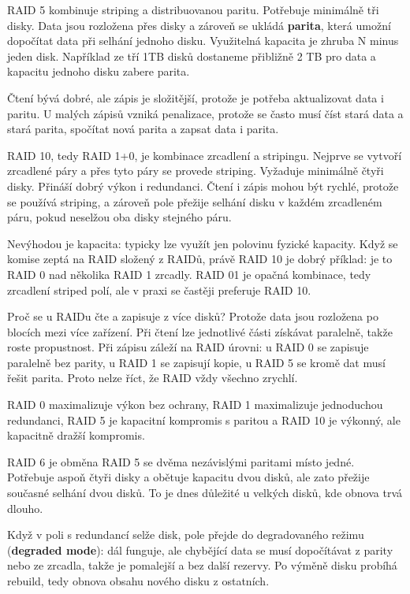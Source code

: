 \documentclass[11pt,a4paper]{article}
\begin{document}
RAID 5 kombinuje striping a distribuovanou paritu. Potřebuje minimálně tři disky. Data jsou rozložena přes disky a zároveň se ukládá \textbf{parita}, která umožní dopočítat data při selhání jednoho disku. Využitelná kapacita je zhruba N minus jeden disk. Například ze tří 1TB disků dostaneme přibližně 2 TB pro data a kapacitu jednoho disku zabere parita.

Čtení bývá dobré, ale zápis je složitější, protože je potřeba aktualizovat data i paritu. U malých zápisů vzniká penalizace, protože se často musí číst stará data a stará parita, spočítat nová parita a zapsat data i parita.

RAID 10, tedy RAID 1+0, je kombinace zrcadlení a stripingu. Nejprve se vytvoří zrcadlené páry a přes tyto páry se provede striping. Vyžaduje minimálně čtyři disky. Přináší dobrý výkon i redundanci. Čtení i zápis mohou být rychlé, protože se používá striping, a zároveň pole přežije selhání disku v každém zrcadleném páru, pokud neselžou oba disky stejného páru.

Nevýhodou je kapacita: typicky lze využít jen polovinu fyzické kapacity. Když se komise zeptá na RAID složený z RAIDů, právě RAID 10 je dobrý příklad: je to RAID 0 nad několika RAID 1 zrcadly. RAID 01 je opačná kombinace, tedy zrcadlení striped polí, ale v praxi se častěji preferuje RAID 10.

Proč se u RAIDu čte a zapisuje z více disků? Protože data jsou rozložena po blocích mezi více zařízení. Při čtení lze jednotlivé části získávat paralelně, takže roste propustnost. Při zápisu záleží na RAID úrovni: u RAID 0 se zapisuje paralelně bez parity, u RAID 1 se zapisují kopie, u RAID 5 se kromě dat musí řešit parita. Proto nelze říct, že RAID vždy všechno zrychlí.

RAID 0 maximalizuje výkon bez ochrany, RAID 1 maximalizuje jednoduchou redundanci, RAID 5 je kapacitní kompromis s paritou a RAID 10 je výkonný, ale kapacitně dražší kompromis.

RAID 6 je obměna RAID 5 se dvěma nezávislými paritami místo jedné. Potřebuje aspoň čtyři disky a obětuje kapacitu dvou disků, ale zato přežije současné selhání dvou disků. To je dnes důležité u velkých disků, kde obnova trvá dlouho.

Když v poli s redundancí selže disk, pole přejde do degradovaného režimu (\textbf{degraded mode}): dál funguje, ale chybějící data se musí dopočítávat z parity nebo ze zrcadla, takže je pomalejší a bez další rezervy. Po výměně disku probíhá rebuild, tedy obnova obsahu nového disku z ostatních.
\end{document}
